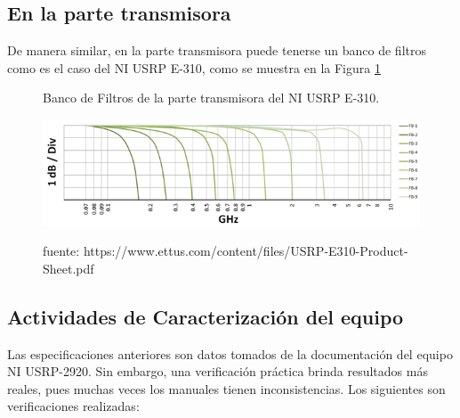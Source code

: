 \subsection{En la parte transmisora}
De manera similar, en la parte transmisora puede tenerse un banco de filtros como es el caso del NI USRP E-310, como se muestra en la Figura \ref{fig:Banco-e310}

\vspace{300px}
\begin{figure}[h!]
	\captionsetup{justification = raggedright, singlelinecheck = false}
	\caption{Banco de Filtros de la parte transmisora del NI USRP E-310.} 
	\centering
	\includegraphics[scale=0.9]{Imagenes/Banco-e310.png}
	\label{fig:Banco-e310}
			\caption*{fuente: https://www.ettus.com/content/files/USRP-E310-Product-Sheet.pdf}
\end{figure}

\subsection{Actividades de Caracterización del equipo}

Las especificaciones anteriores son datos tomados de la documentación del equipo NI USRP-2920. Sin embargo, una verificación práctica brinda resultados más reales, pues muchas veces los manuales tienen inconsistencias. Los siguientes son verificaciones realizadas:

